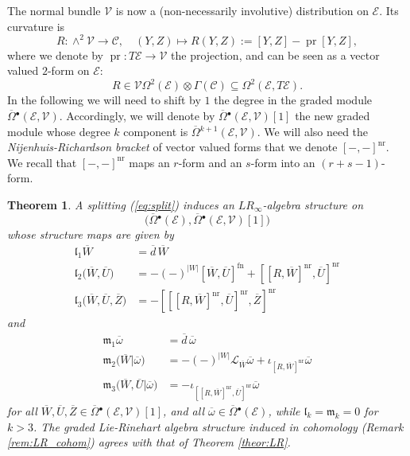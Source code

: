 \documentclass{conm-p-l}
\newtheorem{theorem}{Theorem}[section]
\theoremstyle{definition}
\theoremstyle{remark}
\numberwithin{equation}{section}
\begin{document}
The normal bundle $\mathscr V$ is now a (non-necessarily involutive) distribution on $\mathscr E$. Its curvature is 
\[
R : \wedge^2 \mathscr V \to \mathscr C, \quad (Y, Z) \mapsto R(Y, Z) := [Y, Z] - \operatorname{pr} [Y, Z],
\]  
where we denote by $\operatorname{pr} : T\mathscr E \to \mathscr V$ the projection, and can be seen as a vector valued $2$-form on $\mathscr E$:
\[
R \in \mathscr V\Omega^2 ( \mathscr E) \otimes \Gamma (\mathscr C) \subseteq \Omega^2 (\mathscr E, T\mathscr E).
\]
In the following we will need to shift by $1$ the degree in the graded module $\overline \Omega{}^\bullet (\mathscr E, \mathscr V)$. Accordingly, we will denote by $\overline \Omega{}^\bullet (\mathscr E, \mathscr V)[1]$ the new graded module whose degree $k$ component is $\overline \Omega{}^{k+1} (\mathscr E, \mathscr V)$. We will also need the \emph{Nijenhuis-Richardson bracket} of vector valued forms \cite[Section 16]{m08} that we denote $[-,-]^{\mathrm{nr}}$. We recall that $[-,-]^{\mathrm{nr}}$ maps an $r$-form and an $s$-form into an $(r+s-1)$-form.

\begin{theorem}\label{theor:LR_infty}
A splitting (\ref{eq:split}) induces an $LR_\infty$-algebra structure on 
\[
\big(\overline \Omega{}^\bullet (\mathscr E), \overline \Omega{}^\bullet(\mathscr E, \mathscr V)[1]\big)
\]
whose structure maps are given by
\[
\begin{aligned}
\mathfrak l_1 \overline W & = \overline d\, \overline W \\
\mathfrak l_2 \big(\overline W, \overline U\big) & = - (-)^{|W|} [\overline W, \overline U]^{\mathrm{fn}} + [[R, \overline W]^{\mathrm{nr}}, \overline U]^{\mathrm{nr}} \\
\mathfrak l_3 \big(\overline W, \overline U, \overline Z\big) & = - [[[R, \overline W]^{\mathrm{nr}}, \overline U]^{\mathrm{nr}}, \overline Z]^{\mathrm{nr}}
\end{aligned}
\]
and
\[
\begin{aligned}
\mathfrak m_1 \overline \omega & = \overline d\, \overline \omega \\
\mathfrak m_2 \big(\overline W | \overline \omega\big) & = - (-)^{|W|} \mathcal L_{\overline W} \overline \omega + \iota_{[R, \overline W]^{\mathrm{nr}}} \overline \omega \\
\mathfrak m_3 \big(\overline W, \overline U| \overline \omega\big) & = - \iota_{[[R, \overline W]^{\mathrm{nr}}, \overline U]^{\mathrm{nr}}} \overline \omega
\end{aligned}
\]
for all $\overline W, \overline U, \overline Z \in \overline \Omega{}^\bullet(\mathscr E, \mathscr V)[1]$, and all $\overline \omega \in \overline \Omega{}^\bullet(\mathscr E)$, while $\mathfrak l_k = \mathfrak m_k = 0$ for $k > 3$. 
The graded Lie-Rinehart algebra structure induced in cohomology (Remark \ref{rem:LR_cohom}) agrees with that of Theorem \ref{theor:LR}.
\end{theorem}
\end{document}
